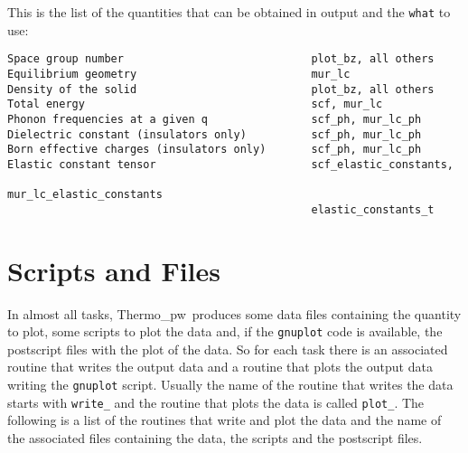 \documentclass[12pt,a4paper,twoside]{report}
\def\tpw{{\sc Thermo\_pw}}
\begin{document}
This is the list of the quantities that can be obtained in output
and the \texttt{what} to use:

\begin{footnotesize}
\begin{verbatim}
Space group number                             plot_bz, all others
Equilibrium geometry                           mur_lc
Density of the solid                           plot_bz, all others
Total energy                                   scf, mur_lc
Phonon frequencies at a given q                scf_ph, mur_lc_ph
Dielectric constant (insulators only)          scf_ph, mur_lc_ph
Born effective charges (insulators only)       scf_ph, mur_lc_ph
Elastic constant tensor                        scf_elastic_constants, 
                                               mur_lc_elastic_constants
                                               elastic_constants_t
\end{verbatim}
\end{footnotesize}

\newpage
{\color{dark-blue}\chapter{Scripts and Files}}
\color{black}

In almost all tasks, \tpw\ produces some data files containing the quantity 
to plot, some scripts to plot the data and, if the \texttt{gnuplot} code
is available, the postscript files with the plot of the data. So for each 
task there is an associated routine
that writes the output data and a routine that plots the output data
writing the \texttt{gnuplot} script. Usually the name of the routine that
writes the data starts with \texttt{write\_} and the routine that plots
the data is called \texttt{plot\_}. The following is a list of the routines
that write and plot the data and the name of the associated files
containing the data, the scripts and the postscript files.
\end{document}
